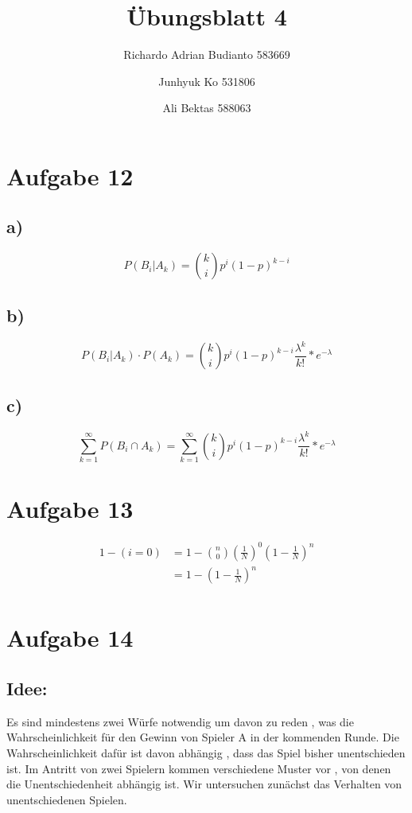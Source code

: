 \documentclass{article}
\title{Übungsblatt 4}
\author{Richardo Adrian Budianto  583669 \and Junhyuk Ko  531806 \and Ali Bektas 588063 }
\begin{document}
\maketitle



\section*{Aufgabe 12}
\subsection*{a)}
\[ P(B_i | A_k) = \binom{k}{i} p^i (1-p)^{k-i}  \]
\subsection*{b)}
\[  P(B_i | A_k) \cdot P(A_k) =  \binom{k}{i} p^i (1-p)^{k-i} \frac{\lambda^k}{k!}*e^{-\lambda}  \]
\subsection*{c)}
\[ \sum_{k=1}^{\infty} P(B_i \cap A_k) =  \sum_{k=1}^{\infty} \binom{k}{i} p^i (1-p)^{k-i} \frac{\lambda^k}{k!}*e^{-\lambda}  \]

\section*{Aufgabe 13}
\begin{align*}
1 - (i=0) &= 1 - \binom{n}{0}(\frac{1}{N})^0(1-\frac{1}{N})^n\\
 	&= 1 - (1 - \frac{1}{N})^n\\
\end{align*}

\section*{Aufgabe 14}
\subsection*{Idee:}
Es sind mindestens zwei Würfe notwendig um davon zu reden , was die Wahrscheinlichkeit für den Gewinn von Spieler A in der kommenden Runde. Die Wahrscheinlichkeit dafür ist davon abhängig , dass das Spiel bisher unentschieden ist. Im Antritt von zwei Spielern kommen verschiedene Muster vor , von denen die Unentschiedenheit abhängig ist. Wir untersuchen zunächst das Verhalten von unentschiedenen Spielen. 
\end{document}

